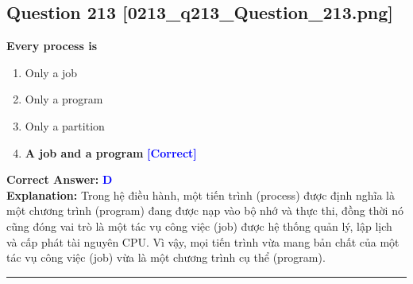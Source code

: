 \documentclass[11pt,a4paper]{article}
\begin{document}
\begin{minipage}{\textwidth}
\subsection*{Question 213 \quad \footnotesize{[0213\_q213\_Question\_213.png]}}
\noindent \textbf{Every process is}

\begin{enumerate}[label=\Alph*.]
    \item Only a job
    \item Only a program
    \item Only a partition
    \item \textbf{A job and a program} \hfill \textcolor{blue}{\textbf{[Correct]}}
\end{enumerate}

\noindent \textbf{Correct Answer:} \textcolor{blue}{\textbf{D}} \\[2pt]
\noindent \textbf{Explanation:} Trong hệ điều hành, một tiến trình (process) được định nghĩa là một chương trình (program) đang được nạp vào bộ nhớ và thực thi, đồng thời nó cũng đóng vai trò là một tác vụ công việc (job) được hệ thống quản lý, lập lịch và cấp phát tài nguyên CPU. Vì vậy, mọi tiến trình vừa mang bản chất của một tác vụ công việc (job) vừa là một chương trình cụ thể (program).

\par\vspace{0.3cm}
\hrule
\vspace{0.3cm}
\end{minipage}
\end{document}
